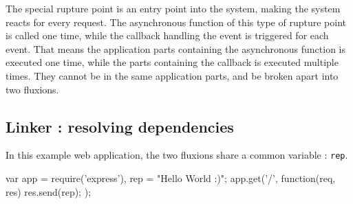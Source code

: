 The special rupture point is an entry point into the system, making the system reacts for every request.
The asynchronous function of this type of rupture point is called one time, while the callback handling the event is triggered for each event.
That means the application parts containing the asynchronous function is executed one time, while the parts containing the callback is executed multiple times.
They cannot be in the same application parts, and be broken apart into two fluxions.















\subsection{Linker : resolving dependencies} \label{ss:linker}

In this example web application, the two fluxions share a common variable : \texttt{rep}.

\begin{code}[Javascript, caption={Hello World with a shared variable},label={lst:sharedhello}]
var app = require('express'),
    rep = "Hello World :)";
app.get('/', function(req, res) {
  res.send(rep);
});
\end{code}

